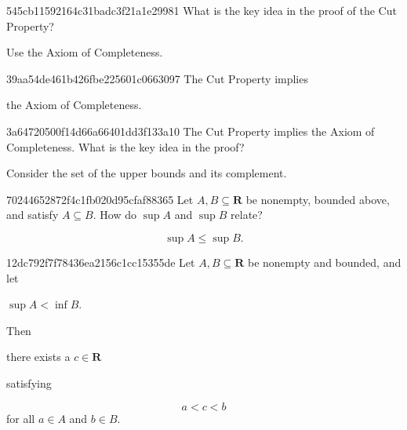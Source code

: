 \begin{note}{545cb11592164c31badc3f21a1e29981}
    What is the key idea in the proof of the Cut Property?

    \begin{cloze}{1}
        Use the Axiom of Completeness.
    \end{cloze}
\end{note}

\begin{note}{39aa54de461b426fbe225601c0663097}
    The Cut Property implies \begin{icloze}{1}the Axiom of Completeness.\end{icloze}
\end{note}

\begin{note}{3a64720500f14d66a66401dd3f133a10}
    The Cut Property implies the Axiom of Completeness.
    What is the key idea in the proof?

    \begin{cloze}{1}
        Consider the set of the upper bounds and its complement.
    \end{cloze}
\end{note}

\begin{note}{70244652872f4c1fb020d95cfaf88365}
    Let \({ A, B \subseteq \mathbf{R} }\) be nonempty, bounded above, and satisfy \({ A \subseteq B }\).
    How do \({ \sup A }\) and \({ \sup B }\) relate?

    \begin{cloze}{1}
        \[
            \sup A \leqslant \sup B.
        \]
    \end{cloze}
\end{note}

\begin{note}{12dc792f7f78436ea2156c1cc15355de}
    Let \({ A, B \subseteq \mathbf{R} }\) be nonempty and bounded, and let \begin{icloze}{2}\({ \sup A < \inf B }\).\end{icloze}
    Then \begin{icloze}{3}there exists a \({ c \in \mathbf{R} }\)\end{icloze} satisfying
    \begin{icloze}{1}
        \[
            a < c < b
        \]
        for all \({ a \in A }\) and \({ b \in B }\).
    \end{icloze}
\end{note}

